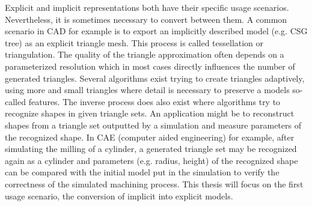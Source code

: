 Explicit and implicit representations both have their specific usage scenarios. Nevertheless, it is sometimes necessary to convert between them.
A common scenario in CAD for example is to export an implicitly described model (e.g. CSG tree) as an explicit triangle mesh. This process is called tessellation or triangulation. The quality of the triangle approximation often depends on a parameterized resolution which in most cases directly influences the number of generated triangles. Several algorithms exist trying to create triangles adaptively, using more and small triangles where detail is necessary to preserve a models so-called features.
The inverse process does also exist where algorithms try to recognize shapes in given triangle sets. An application might be to reconstruct shapes from a triangle set outputted by a simulation and measure parameters of the recognized shape. In CAE (computer aided engineering) for example, after simulating the milling of a cylinder, a generated triangle set may be recognized again as a cylinder and parameters (e.g. radius, height) of the recognized shape can be compared with the initial model put in the simulation to verify the correctness of the simulated machining process.
This thesis will focus on the first usage scenario, the conversion of implicit into explicit models.